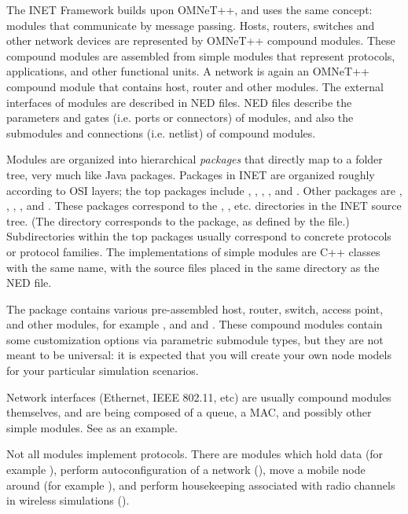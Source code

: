 The INET Framework builds upon OMNeT++, and uses the same concept: modules
that communicate by message passing. Hosts, routers, switches and other
network devices are represented by OMNeT++ compound modules. These compound
modules are assembled from simple modules that represent protocols,
applications, and other functional units. A network is again an OMNeT++
compound module that contains host, router and other modules. The external
interfaces of modules are described in NED files. NED files describe the
parameters and gates (i.e. ports or connectors) of modules, and also the
submodules and connections (i.e. netlist) of compound modules.

Modules are organized into hierarchical \textit{packages} that directly map to
a folder tree, very much like Java packages. Packages in
INET are organized roughly according to OSI layers; the top packages
include , ,
, , and . 
Other packages are , , , 
, and . These packages correspond to the 
, , etc. directories in the
INET source tree. (The  directory corresponds to the  
package, as defined by the  file.) Subdirectories
within the top packages usually correspond to concrete protocols or protocol
families. The implementations of simple modules are C++ classes with the same
name, with the source files placed in the same directory as the NED file.

The  package contains various pre-assembled host, router,
switch, access point, and other modules, for example
,  and  and
. These compound modules contain some customization
options via parametric submodule types, but they are not meant to be
universal: it is expected that you will create your own node models for
your particular simulation scenarios.

Network interfaces (Ethernet, IEEE 802.11, etc) are usually compound modules
themselves, and are being composed of a queue, a MAC, and possibly other
simple modules. See  as an example.

Not all modules implement protocols. There are modules which hold data (for
example ), perform autoconfiguration of a network
(), move a mobile node around (for example
), and perform housekeeping associated with
radio channels in wireless simulations ().

